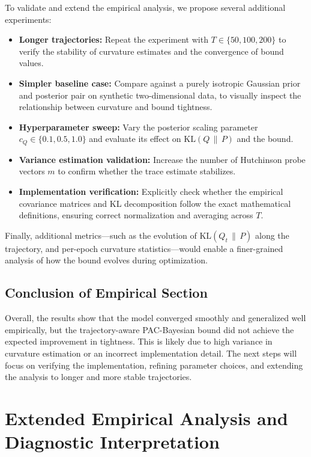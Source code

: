 To validate and extend the empirical analysis, we propose several additional experiments:

\begin{itemize}
    \item \textbf{Longer trajectories:} Repeat the experiment with $T \in \{50, 100, 200\}$ to verify the stability of curvature estimates and the convergence of bound values.
    \item \textbf{Simpler baseline case:} Compare against a purely isotropic Gaussian prior and posterior pair on synthetic two-dimensional data, to visually inspect the relationship between curvature and bound tightness.
    \item \textbf{Hyperparameter sweep:} Vary the posterior scaling parameter $c_Q \in \{0.1, 0.5, 1.0\}$ and evaluate its effect on $\mathrm{KL}(Q\,\|\,P)$ and the bound.
    \item \textbf{Variance estimation validation:} Increase the number of Hutchinson probe vectors $m$ to confirm whether the trace estimate stabilizes.
    \item \textbf{Implementation verification:} Explicitly check whether the empirical covariance matrices and KL decomposition follow the exact mathematical definitions, ensuring correct normalization and averaging across $T$.
\end{itemize}

Finally, additional metrics—such as the evolution of $\mathrm{KL}(Q_t \,\|\, P)$ along the trajectory, and per-epoch curvature statistics—would enable a finer-grained analysis of how the bound evolves during optimization.

\subsection{Conclusion of Empirical Section}

Overall, the results show that the model converged smoothly and generalized well empirically, but the trajectory-aware PAC-Bayesian bound did not achieve the expected improvement in tightness. This is likely due to high variance in curvature estimation or an incorrect implementation detail. The next steps will focus on verifying the implementation, refining parameter choices, and extending the analysis to longer and more stable trajectories.

\section{Extended Empirical Analysis and Diagnostic Interpretation}

